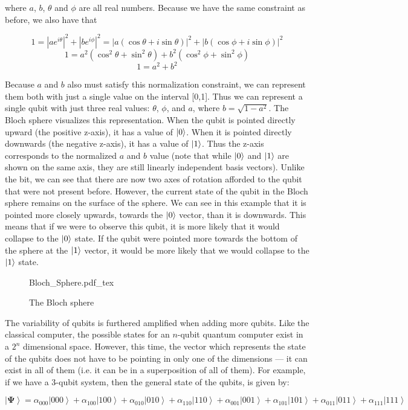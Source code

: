 \documentclass[11pt]{report}
\newcommand{\?}{\stackrel{?}{=}}
\begin{document}
where $a$, $b$, $\theta$ and $\phi$ are all real numbers. Because we have the same constraint as before, we also have that

$$1 = |ae^{i\theta}|^2 + |be^{i\phi}|^2 = |a(\cos{\theta}+i\sin{\theta})|^2 + |b(\cos{\phi}+i\sin{\phi})|^2$$
$$1 = a^2(\cos^2{\theta} + \sin^2{\theta}) + b^2(\cos^2{\phi} + \sin^2{\phi})$$
$$1 = a^2 + b^2$$

Because $a$ and $b$ also must satisfy this normalization constraint, we can represent them both with just a single value on the interval [0,1]. Thus we can represent a single qubit with just three real values: $\theta$, $\phi$, and $a$, where $b = \sqrt{1 - a^2}$. The Bloch sphere visualizes this representation. When the qubit is pointed directly upward (the positive z-axis), it has a value of $\ket{0}$. When it is pointed directly downwards (the negative z-axis), it has a value of $\ket{1}$. Thus the z-axis corresponds to the normalized $a$ and $b$ value (note that while $\ket{0}$ and $\ket{1}$ are shown on the same axis, they are still linearly independent basis vectors).  Unlike the bit, we can see that there are now two axes of rotation afforded to the qubit that were not present before. However, the current state of the qubit in the Bloch sphere remains on the surface of the sphere. We can see in this example that it is pointed more closely upwards, towards the $\ket{0}$ vector, than it is downwards. This means that if we were to observe this qubit, it is more likely that it would collapse to the $\ket{0}$ state. If the qubit were pointed more towards the bottom of the sphere at the $\ket{1}$ vector, it would be more likely that we would collapse to the $\ket{1}$ state.

\begin{figure}[!h]
    \centering
    \def\svgwidth{2in}
    {Bloch_Sphere.pdf_tex}
    \caption{The Bloch sphere}
    \label{fig:awesome_image}
\end{figure}

The variability of qubits is furthered amplified when adding more qubits. Like the classical computer, the possible states for an $n$-qubit quantum computer exist in a $2^{n}$ dimensional space. However, this time, the vector which represents the state of the qubits does not have to be pointing in only one of the dimensions --- it can exist in all of them (i.e. it can be in a superposition of all of them). For example, if we have a 3-qubit system, then the general state of the qubits, is given by:

$$ \left | \mathbf{\Psi} \right \rangle=\alpha _{000}\left | 000 \right \rangle+\alpha _{100}\left | 100 \right \rangle+\alpha _{010}\left | 010 \right \rangle+\alpha _{110}\left | 110 \right 
                \rangle+\alpha _{001}\left | 001 \right \rangle+\alpha _{101}\left | 101 \right \rangle+\alpha _{011}\left | 011 \right \rangle+\alpha _{111}\left | 111 
                \right \rangle$$
                
\end{document}
